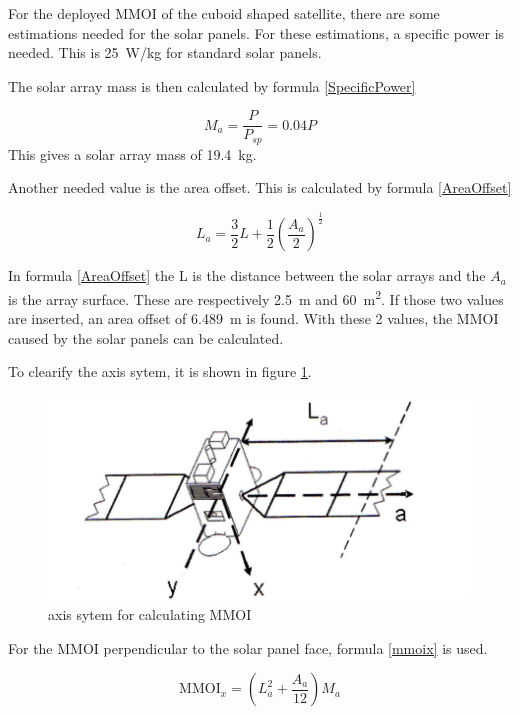 For the deployed MMOI of the cuboid shaped satellite, there are some
estimations needed for the solar panels. For these estimations, a
specific power is needed. This is \SI{25}{W/kg} for standard solar
panels. \cite{wertz1999space}

The solar array mass is then calculated by formula \ref{SpecificPower}

\begin{equation}
  \label{SpecificPower}
  M_a=\frac{P}{P_{sp}}=0.04 P
\end{equation}
This gives a solar array mass of \SI{19.4}{kg}.

Another needed value is the area offset. This is calculated by formula \ref{AreaOffset}

\begin{equation}
  \label{AreaOffset}
  L_a=\frac{3}{2}L+\frac{1}{2} \left(\frac{A_a}{2} \right)^{\frac{1}{2}}
\end{equation}

In formula \ref{AreaOffset} the L is the distance between the solar
arrays and the $A_a$ is the array surface. These are respectively
\SI{2.5}{m} and \SI{60}{m^2}. If those two values are inserted, an
area offset of \SI{6.489}{m} is found. With these 2 values, the MMOI
caused by the solar panels can be calculated.

To clearify the axis sytem, it is shown in figure
\ref{axissystemcuboid}.

\begin{figure}[H]
  \centering
  \includegraphics[width=\textwidth]{axissystem}
  \caption{axis sytem for calculating MMOI}
  \label{axissystemcuboid}
\end{figure}

For the MMOI perpendicular to the solar panel face, formula
\ref{mmoix} is used.

\begin{equation}
  \label{mmoix}
  \mathrm{MMOI}_x=\left(L_a^2+\frac{A_a}{12}\right)M_a
\end{equation}

